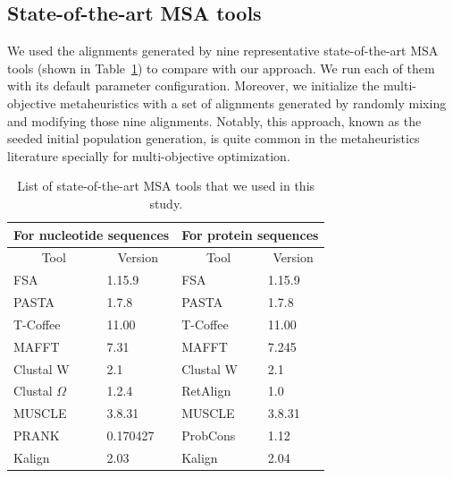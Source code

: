 \subsection{State-of-the-art MSA tools}
We used the alignments generated by nine representative state-of-the-art MSA tools (shown in Table~\ref{tab:msa_tools}) to compare with our approach. We run each of them with its default parameter configuration. Moreover, we initialize the multi-objective metaheuristics with a set of alignments generated by randomly mixing and modifying those nine alignments. Notably, this approach, known as the seeded initial population generation, is quite common in the metaheuristics literature specially for multi-objective optimization. 

\begin{table}[htbp]
	\centering
	\caption{List of state-of-the-art MSA tools that we used in this study.}
	\begin{tabular}{|l|l||l|l|}
		\hline
		\multicolumn{2}{|c||}{For nucleotide sequences} & \multicolumn{2}{c|}{For protein sequences} \\
		\hline
		\multicolumn{1}{|c|}{Tool} & \multicolumn{1}{c||}{Version} & \multicolumn{1}{c|}{Tool} & \multicolumn{1}{c|}{Version} \\
		\hline
		FSA~\citep{bradley2009fast} & 1.15.9 & FSA   & 1.15.9 \\
		\hline
		PASTA~\citep{mirarab2015pasta} & 1.7.8 & PASTA & 1.7.8 \\
		\hline
		T-Coffee~\citep{notredame2000t} & 11.00 & T-Coffee & 11.00 \\
		\hline
		MAFFT~\citep{katoh2002mafft} & 7.31  & MAFFT & 7.245 \\
		\hline
		Clustal W~\citep{thompson1994clustal} & 2.1   & Clustal W & 2.1 \\
		\hline
		Clustal $ \Omega $~\citep{sievers2011fast} & 1.2.4 & RetAlign~\citep{szabo2010reticular} & 1.0 \\
		\hline
		MUSCLE~\citep{edgar2004muscle} & 3.8.31 & MUSCLE & 3.8.31 \\
		\hline
		PRANK~\citep{loytynoja2005algorithm} & 0.170427 & ProbCons~\citep{do2005probcons} & 1.12 \\
		\hline
		Kalign~\citep{lassmann2008kalign2} & 2.03  & Kalign & 2.04 \\
		\hline
	\end{tabular}%
	\label{tab:msa_tools}%
\end{table}%

